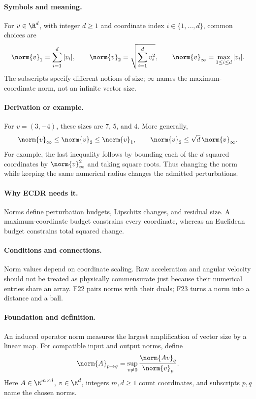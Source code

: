 \paragraph{Symbols and meaning.}
For $v\in\R^d$, with integer $d\ge1$ and coordinate index
$i\in\{1,\ldots,d\}$, common choices are
\[
 \norm{v}_1=\sum_{i=1}^d|v_i|,\qquad
 \norm{v}_2=\sqrt{\sum_{i=1}^d v_i^2},\qquad
 \norm{v}_\infty=\max_{1\le i\le d}|v_i|.
\]
The subscripts specify different notions of size; $\infty$ names the
maximum-coordinate norm, not an infinite vector size.
\paragraph{Derivation or example.}
For $v=(3,-4)$, these sizes are $7$, $5$, and $4$. More generally,
\[
 \norm{v}_\infty\le\norm{v}_2\le\norm{v}_1,
 \qquad \norm{v}_2\le\sqrt d\,\norm{v}_\infty.
\]
For example, the last inequality follows by bounding each of the $d$
squared coordinates by $\norm{v}_\infty^2$ and taking square roots.
Thus changing the norm while keeping the same numerical radius changes
the admitted perturbations.
\paragraph{Why ECDR needs it.}
Norms define perturbation budgets, Lipschitz changes, and residual size.
A maximum-coordinate budget constrains every coordinate, whereas an
Euclidean budget constrains total squared change.
\paragraph{Conditions and connections.}
Norm values depend on coordinate scaling. Raw acceleration and angular
velocity should not be treated as physically commensurate just because
their numerical entries share an array. F22 pairs norms with their duals;
F23 turns a norm into a distance and a ball.

\paragraph{Foundation and definition.}
An induced operator norm measures the largest amplification of vector
size by a linear map. For compatible input and output norms, define
\[
 \norm{A}_{p\to q}
 =\sup_{v\ne0}\frac{\norm{Av}_q}{\norm{v}_p}.
\]
Here $A\in\R^{m\times d}$, $v\in\R^d$, integers $m,d\ge1$
count coordinates, and subscripts $p,q$ name the chosen norms.
